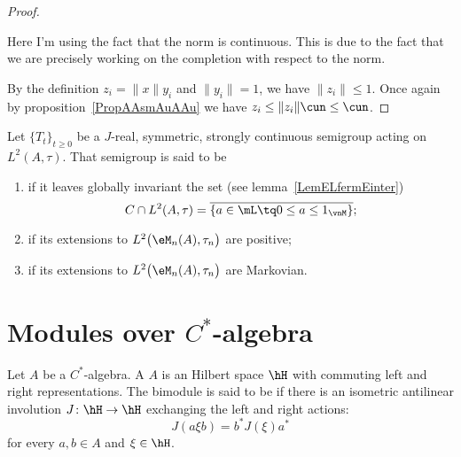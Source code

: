 \begin{proof}
    \begin{probleme}
        Here I'm using the fact that the norm is continuous. This is due to the fact that we are precisely working on the completion with respect to the norm.
    \end{probleme}

    By the definition \(z_i=\| x \|y_i\) and \(\| y_i \|=1\), we have \(\| z_i \|\leq 1\). Once again by proposition~\ref{PropAAsmAuAAu} we have \(z_i\leq\| z_i \|\cun\leq \cun\).

\end{proof}

\begin{definition}
    Let $\{ T_t \}_{t\geq 0}$ be a $J$-real, symmetric, strongly continuous semigroup acting on $L^2(A,\tau)$. That semigroup is said to be
    \begin{enumerate}
        \item
             if it leaves globally invariant the set (see lemma~\ref{LemELfermEinter})
            \begin{equation}
                C\cap L^2(A,\tau)=\overline{ \{ a\in\mL\tq 0\leq a\leq 1_{\vnM} \} };
            \end{equation}
        \item
             if its extensions to $L^2\big( \eM_n(A),\tau_n \big)$ are positive;
        \item
             if its extensions to $L^2\big( \eM_n(A),\tau_n \big)$ are Markovian.
    \end{enumerate}
\end{definition}

\section{Modules over $C^*$-algebra}

\begin{definition}
	Let $A$ be a $C^*$-algebra. A $A$ is an Hilbert space $\hH$ with commuting left and right representations. The bimodule is said to be  if there is an isometric antilinear involution $J\colon \hH\to \hH$ exchanging the left and right actions:
	\begin{equation}
		J(a\xi b)=b^*J(\xi)a^*
	\end{equation}
	for every $a,b\in A$ and $\xi\in\hH$.
\end{definition}

